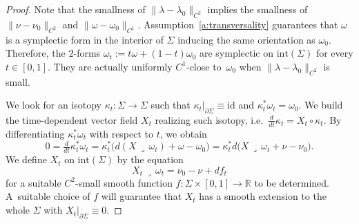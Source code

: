 \documentclass[10pt,a4paper]{article}
\providecommand{\ie}{i.e.\ }
\let\mathds\mathbb
\theoremstyle{definition}
\newcommand{\R}{\mathds{R}}
\let\diff d
\begin{document}
\begin{proof}
Note that the smallness of $\|\lambda-\lambda_0\|_{C^2}$ implies the smallness of $\|\nu-\nu_0\|_{C^2}$ and $\|\omega-\omega_0\|_{C^1}$. Assumption~\ref{a:transversality} guarantees that $\omega$ is a symplectic form in the interior of $\Sigma$ inducing the same orientation as $\omega_0$. Therefore, the $2$-forms $\omega_t:=t\omega+(1-t)\omega_0$ are symplectic on $\mathrm{int}(\Sigma)$ for every $t\in[0,1]$. They are actually uniformly $C^1$-close to~$\omega_0$ when $\|\lambda-\lambda_0\|_{C^2}$ is small.

We look for an isotopy $\kappa_t:\Sigma\to\Sigma$ such that $\kappa_t|_{\partial\Sigma}\equiv\mathrm{id}$ and $\kappa_t^*\omega_t=\omega_0$. We build the time-dependent vector field $X_t$ realizing such isotopy, \ie $\tfrac{\diff}{\diff t}\kappa_t=X_t\circ\kappa_t$. By differentiating $\kappa_t^*\omega_t$ with respect to $t$, we obtain
\begin{equation}
\label{e:X_Moser_0}
0=\tfrac{\diff}{\diff t}\kappa_t^*\omega_t
=
\kappa_t^* \big( \diff(X\,\lrcorner\,\omega_t) + \omega-\omega_0 \big)
=
\kappa_t^* \diff\big(X\,\lrcorner\,\omega_t + \nu-\nu_0 \big) .
\end{equation}
We define $X_t$ on $\mathrm{int}(\Sigma)$ by the equation
\begin{equation}
\label{e:X_Moser}
X_t\,\lrcorner\,\omega_t = \nu_0 - \nu + \diff f_t
\end{equation}
for a suitable $C^2$-small smooth function $f:\Sigma\times [0,1] \to\R$ to be determined. A~suitable choice of $f$ will guarantee that $X_t$ has a smooth extension to the whole $\Sigma$ with $X_t|_{\partial\Sigma}\equiv0$.


\end{proof}
\end{document}
